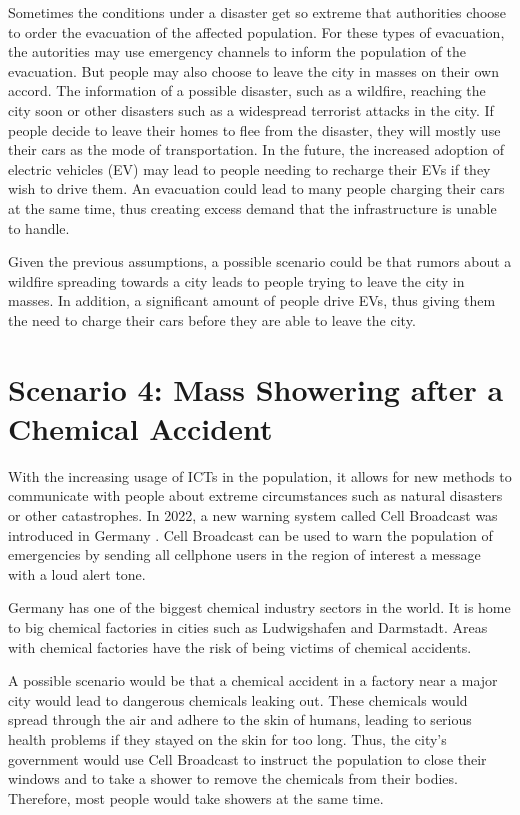 Sometimes the conditions under a disaster get so extreme that 
authorities choose to order the evacuation of the affected population.
For these types of evacuation, the autorities may use emergency channels 
to inform the population of the evacuation.
But people may also choose to leave the city in masses on their own accord.
The information of a possible disaster, such as a wildfire, reaching the
city soon or other disasters such as a widespread terrorist attacks 
in the city.
If people decide to leave their homes to flee from the disaster, they 
will mostly use their cars as the mode of transportation.
In the future, the increased adoption of electric vehicles (EV)
may lead to people needing to recharge their EVs if they wish 
to drive them. An evacuation could lead to many people charging
their cars at the same time, thus creating excess demand that 
the infrastructure is unable to handle. 

Given the previous assumptions, a possible scenario could be that 
rumors about a wildfire spreading towards a city leads to people
trying to leave the city in masses. In addition, a significant 
amount of people drive EVs, thus giving them the need to charge
their cars before they are able to leave the city.


\section{Scenario 4: Mass Showering after a Chemical Accident}

With the increasing usage of ICTs in the population, it allows for 
new methods to communicate with people about extreme circumstances
such as natural disasters or other catastrophes. In 2022,
a new warning system called Cell Broadcast was introduced in Germany
\cite{techrichtlinie}. Cell Broadcast can be used to warn the population
of emergencies by sending all cellphone users in the 
region of interest a message with a loud alert tone.

Germany has one of the biggest chemical industry sectors in the world.
It is home to big chemical factories in cities such as Ludwigshafen and
Darmstadt. Areas with chemical factories have the risk of being
victims of chemical accidents.

A possible scenario would be that a chemical accident in a 
factory near a major city would lead to dangerous chemicals 
leaking out. These chemicals would spread through the air 
and adhere to the skin of humans, leading to serious 
health problems if they stayed on the skin for too long.
Thus, the city's government would use Cell Broadcast to
instruct the population to close their windows and 
to take a shower to remove the chemicals from their bodies.
Therefore, most people would take showers at the same time.


